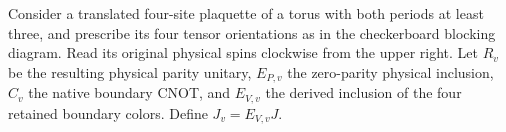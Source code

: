 \begin{definition}
    \label{def:peps_kitaev_native_physical_support}
    \leanok
    Consider a translated four-site plaquette of a torus with both periods
    at least three, and prescribe its four tensor orientations as in the
    checkerboard blocking diagram. Read its original physical spins clockwise
    from the upper right. Let $R_v$ be the resulting physical parity unitary,
    $E_{P,v}$ the zero-parity physical inclusion, $C_v$ the native boundary CNOT,
    and $E_{V,v}$ the derived inclusion of the four retained boundary colors.
    Define $J_v=E_{V,v}J$.
\end{definition}

